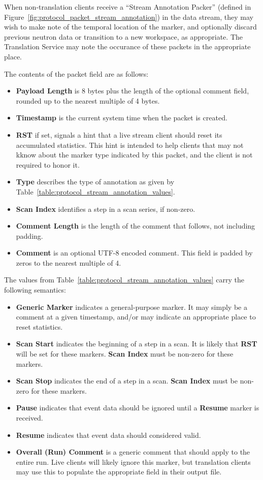 When non-translation clients receive a ``Stream Annotation Packer'' (defined in
Figure~\ref{fig:protocol_packet_stream_annotation}) in the data stream, they
may wish to make note of the temporal location of the marker, and optionally
discard previous neutron data or transition to a new workspace, as appropriate.
The Translation Service may note the occurance of these packets in the
appropriate place.

The contents of the packet field are as follows:
\begin{itemize}
\item{\bf Payload Length} is 8 bytes plus the length of the optional
comment field, rounded up to the nearest multiple of 4 bytes.
\item{\bf Timestamp} is the current system time when the packet is created.
\item{\bf RST} if set, signals a hint that a live stream client should reset
its accumulated statistics. This hint is intended to help clients that may not
kknow about the marker type indicated by this packet, and the client is not
required to honor it.
\item{\bf Type} describes the type of annotation as given by
Table~\ref{table:protocol_stream_annotation_values}.
\item{\bf Scan Index} identifies a step in a scan series, if non-zero.
\item{\bf Comment Length} is the length of the comment that follows, not
including padding.
\item{\bf Comment} is an optional UTF-8 encoded comment.  This field is padded
by zeros to the nearest multiple of 4.
\end{itemize}

The values from Table~\ref{table:protocol_stream_annotation_values} carry
the following semantics:
\begin{itemize}
\item{\bf Generic Marker} indicates a general-purpose marker. It may simply be
a comment at a given timestamp, and/or may indicate an appropriate place to
reset statistics.
\item{\bf Scan Start} indicates the beginning of a step in a scan. It is likely
that {\bf RST} will be set for these markers. {\bf Scan Index} must be non-zero
for these markers.
\item{\bf Scan Stop} indicates the end of a step in a scan.  {\bf Scan Index}
must be non-zero for these markers.
\item{\bf Pause} indicates that event data should be ignored until a {\bf Resume} marker is received.
\item{\bf Resume} indicates that event data should considered valid.
\item{\bf Overall (Run) Comment} is a generic comment that should apply to the
entire run. Live clients will likely ignore this marker, but translation
clients may use this to populate the appropriate field in their output file.
\end{itemize}



